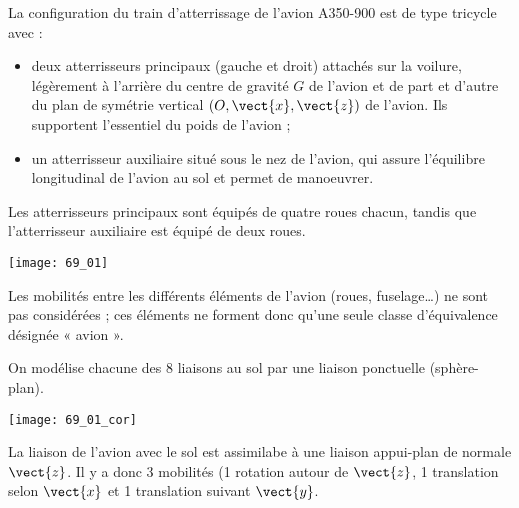 \normaltrue \difficilefalse \tdifficilefalse
\correctiontrue

\exer{ $\star$ \label{B2:16:69}}
\setcounter{question}{0}


\ifcorrection
\else
{}
\fi

\ifprof
\else
La configuration du train d’atterrissage de l’avion A350-900 est de type tricycle avec :
\begin{itemize}
\item deux atterrisseurs principaux (gauche et droit) attachés sur la voilure, légèrement à
l’arrière du centre de gravité $G$ de l’avion et de part et d’autre du plan de symétrie
vertical $\left(O, \vect{x}, \vect{z}\right)$ de l'avion. Ils supportent l’essentiel du poids de l’avion ;
\item un atterrisseur auxiliaire situé sous le nez de l’avion, qui assure l’équilibre longitudinal
de l’avion au sol et permet de manoeuvrer.
\end{itemize}
Les atterrisseurs principaux sont équipés de quatre roues chacun, tandis que
l’atterrisseur auxiliaire est équipé de deux roues.



\begin{center}
\texttt{[image: 69\_01]}
\end{center}

Les mobilités entre les différents éléments de l’avion (roues,
fuselage…) ne sont pas considérées ; ces éléments ne forment donc qu’une seule
classe d’équivalence désignée « avion ».

\fi

On modélise chacune des 8 liaisons au sol par une liaison ponctuelle (sphère-plan).
\ifprof
\begin{center}
\texttt{[image: 69\_01\_cor]}
\end{center}
\else 
\fi

\ifprof
La liaison de l'avion avec le sol est assimilabe à une liaison appui-plan de normale $\vect{z}$. Il y a donc 3 mobilités (1 rotation autour de $\vect{z}$, 1 translation selon $\vect{x}$ et 1 translation suivant $\vect{y}$.

